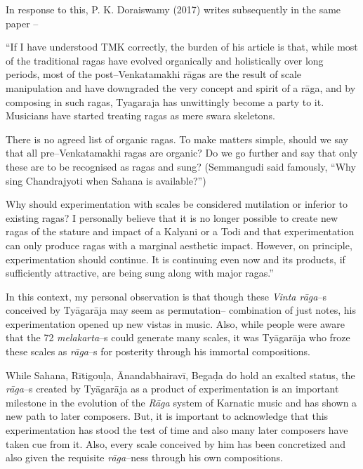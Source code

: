 In response to this, P. K. Doraiswamy (2017) writes subsequently in the same paper –

\begin{myquote}
“If I have understood TMK correctly, the burden of his article is that, while most of the traditional ragas have evolved organically and holistically over long periods, most of the post–Venkatamakhi rāgas are the result of scale manipulation and have downgraded the very concept and spirit of a rāga, and by composing in such ragas, Tyagaraja has unwittingly become a party to it. Musicians have started treating ragas as mere swara skeletons.
\end{myquote}

\begin{myquote}
There is no agreed list of organic ragas. To make matters simple, should we say that all pre–Venkatamakhi ragas are organic? Do we go further and say that only these are to be recognised as ragas and sung? (Semmangudi said famously, “Why sing Chandrajyoti when Sahana is available?”)
\end{myquote}

\begin{myquote}
Why should experimentation with scales be considered mutilation or inferior to existing ragas? I personally believe that it is no longer possible to create new ragas of the stature and impact of a Kalyani or a Todi and that experimentation can only produce ragas with a marginal aesthetic impact. However, on principle, experimentation should continue. It is continuing even now and its products, if sufficiently attractive, are being sung along with major ragas.”
\end{myquote}

In this context, my personal observation is that though these \textit{Vinta rāga}–s conceived by Tyāgarāja may seem as permutation– combination of just notes, his experimentation opened up new vistas in music. Also, while people were aware that the 72 \textit{melakarta}–s could generate many scales, it was Tyāgarāja who froze these scales as \textit{rāga}–s for posterity through his immortal compositions.

While Sahana, Rītigouḷa, Ānandabhairavī, Begaḍa do hold an exalted status, the \textit{rāga}–s created by Tyāgarāja as a product of experimentation is an important milestone in the evolution of the \textit{Rāga} system of Karnatic music and has shown a new path to later composers. But, it is important to acknowledge that this experimentation has stood the test of time and also many later composers have taken cue from it. Also, every scale conceived by him has been concretized and also given the requisite \textit{rāga}–ness through his own compositions.

